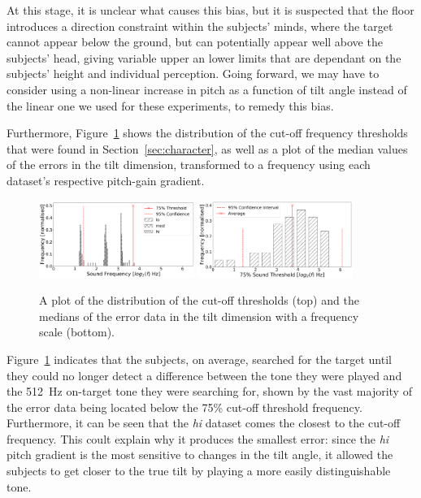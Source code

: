 \documentclass[format=sigconf, review=true, screen=true, anonymous=true]{acmart}
\begin{document}
At this stage, it is unclear what causes this bias, but it is suspected that the floor introduces a direction constraint within the subjects' minds, where the target cannot appear below the ground, but can potentially appear well above the subjects' head, giving variable upper an lower limits that are dependant on the subjects' height and individual perception. Going forward, we may have to consider using a non-linear increase in pitch as a function of tilt angle instead of the linear one we used for these experiments, to remedy this bias. 

Furthermore, Figure~\ref{fig:tone-threshold} shows the distribution of the cut-off frequency thresholds that were found in Section~\ref{sec:character}, as well as a plot of the median values of the errors in the tilt dimension, transformed to a frequency using each dataset's respective pitch-gain gradient. 

\begin{figure}
  \centering
  \includegraphics[width=0.45\textwidth]{figures/tone_medians.png}
  \includegraphics[width=0.45\textwidth]{figures/tone_threshold.png}
  \caption{A plot of the distribution of the cut-off thresholds (top) and the medians of the error data in the tilt dimension with a frequency scale (bottom).}
  \label{fig:tone-threshold}
\end{figure}

Figure~\ref{fig:tone-threshold} indicates that the subjects, on average, searched for the target until they could no longer detect a difference between the tone they were played and the \SI{512}{\hertz} on-target tone they were searching for, shown by the vast majority of the error data being located below the 75\% cut-off threshold frequency. Furthermore, it can be seen that the \emph{hi} dataset comes the closest to the cut-off frequency. This coult explain why it produces the smallest error: since the \emph{hi} pitch gradient is the most sensitive to changes in the tilt angle, it allowed the subjects to get closer to the true tilt by playing a more easily distinguishable tone.
\end{document}

